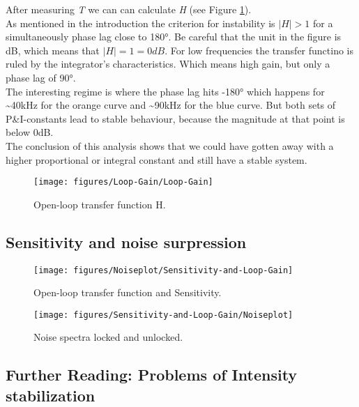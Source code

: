 \documentclass[10pt]{article}
\begin{document}
After measuring \emph{T} we can can calculate \emph{H} (see Figure
\ref{458024}).\\
As mentioned in the introduction the criterion for instability is
\(\left|H\right|>1\) for a simultaneously phase lag close to 180°. Be
careful that the unit in the figure is dB, which means that
\(\left|H\right|= 1 = 0 dB\). For low frequencies the transfer functino is ruled
by the integrator's characteristics. Which means high gain, but only a
phase lag of 90°.\\
The interesting regime is where the phase lag hits -180° which happens
for \textasciitilde{}40kHz for the orange curve and
\textasciitilde{}90kHz for the blue curve. But both sets of
P\&I-constants lead to stable behaviour, because the magnitude at that
point is below 0dB.\\
The conclusion of this analysis shows that we could have gotten away
with a higher proportional or integral constant and still have a stable
system.
\begin{figure}[h!]
\begin{center}
\texttt{[image: figures/Loop-Gain/Loop-Gain]}
\caption{{Open-loop transfer function H.~
{\label{458024}}%
}}
\end{center}
\end{figure}

\subsection{Sensitivity and noise
surpression}\label{sensitivity-and-noise-surpression}
\begin{figure}[h!]
\begin{center}
\texttt{[image: figures/Noiseplot/Sensitivity-and-Loop-Gain]}
\caption{{Open-loop transfer function and Sensitivity.
{\label{827693}}%
}}
\end{center}
\end{figure}
\begin{figure}[h!]
\begin{center}
\texttt{[image: figures/Sensitivity-and-Loop-Gain/Noiseplot]}
\caption{{Noise spectra locked and unlocked.~
{\label{334258}}%
}}
\end{center}
\end{figure}



\subsection{Further Reading: Problems of Intensity
stabilization}\label{further-reading-problems-of-intensity-stabilization}
\end{document}
